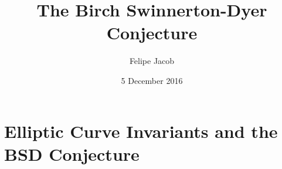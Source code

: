 \documentclass[12pt, a4paper]{amsart}
\begin{document}

\theoremstyle{plain}
\newtheorem{prop}{Proposition}[subsection]
\newtheorem{thm}[prop]{Theorem}
\newtheorem{cor}[prop]{Corollary}
\newtheorem{lemma}[prop]{Lemma}
\newtheorem{conj}[prop]{Conjecture}

\theoremstyle{definition}
\newtheorem{example}[prop]{Example}
\newtheorem{defn}[prop]{Definition}

\theoremstyle{remark}
\newtheorem{remark}[prop]{Remark}


\newcommand{\defin}{\textbf}
\newcommand{\CC}{{\mathbb C}}
\newcommand{\cov}{{\operatorname{cov}}}
\newcommand{\eE}{{\mathcal E}}
\newcommand{\NN}{{\mathbb N}}
\newcommand{\PP}{{\mathbb P}}
\newcommand{\ZZ}{{\mathbb Z}}
\renewcommand{\SS}{{\mathbb S}}
\newcommand{\DD}{{\mathbb D}}
\newcommand{\RR}{{\mathbb R}}
\newcommand{\QQ}{{\mathbb Q}}
\newcommand{\rR}{{\mathcal R}}
\newcommand{\OO}{{\mathcal O}}
\newcommand{\p}{\partial}
\newcommand{\mM}{{\mathcal M}}
\newcommand{\pP}{{\mathcal P}}
\newcommand{\iI}{{\mathcal I}}
\newcommand{\jJ}{{\mathcal J}}
\newcommand{\uU}{{\mathcal U}}
\newcommand{\sS}{{\mathfrak S}}
\newcommand{\1}{{\mathds 1}}
\newcommand{\Crit}{\operatorname{Crit}}
\newcommand{\red}[1]{{\color{red}#1}}
\newcommand{\GKK}{{G_{\bar{K} : K}}}
\newcommand{\st}{{\text{s.t.}}}
\newcommand{\ra}{\rightarrow}
\newcommand{\Sel}{\text{Sel}}
\newcommand{\Sha}{\text{Sha}}
\newcommand{\TS}{\text{TS}}
\newcommand{\Eb}{\bar{E}}
\newcommand{\EQ}{E(\QQ)}
\newcommand{\cmark}{\ding{51}}
\newcommand{\xmark}{\ding{55}}
\newcommand{\EFp}{{\tilde{E}(\FF_p)}}
\newcommand{\EFt}{{\tilde{E}(\FF_2)}}
\newcommand{\EQp}{{E(\QQ_p)}}
\newcommand{\FF}{\mathbb{F}}


\title{
  {The Birch Swinnerton-Dyer Conjecture}\\
}
\author{Felipe Jacob}
\date{5 December 2016}

\tableofcontents
\pagebreak

\maketitle

\section{Elliptic Curve Invariants and the BSD Conjecture}
\end{document}

